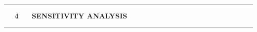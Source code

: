 \documentclass[11pt, compress, t, notes = noshow, xcolor = table, 
aspectratio = 1610]{beamer}
\newcommand{\highlight}[1]{\textcolor{highlightcol}{\textbf{#1}}}
\newcommand{\flexitem}[1]{\item[$\highlight{#1}$]}
\begin{document}

% 
% 


\LARGE
\begin{frame}{\phantom{foo}}
\normalsize
\vspace{-0.5cm}
\noindent \textcolor{gray!90}{\rule{\textwidth}{1pt}}
\smallskip

\Huge
\hspace{0pt}
\vfill
\textbf{\highlight{~~ 4 ~~ SENSITIVITY ANALYSIS}}
\vfill
\hspace{0pt}

\noindent \textcolor{gray!90}{\rule{\textwidth}{1pt}}

\end{frame}

\end{document}
